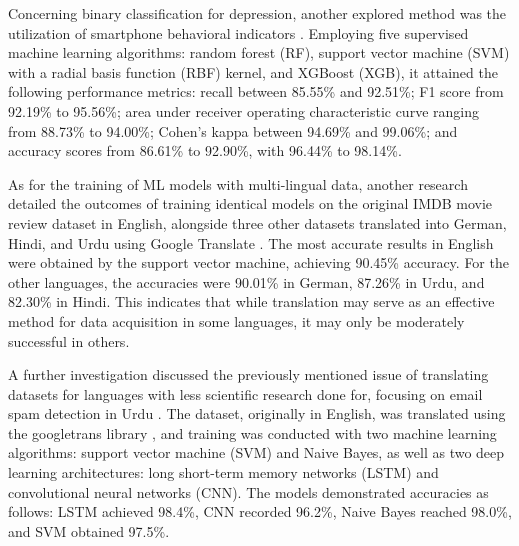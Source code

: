 Concerning binary classification for depression, another explored method was the utilization of smartphone behavioral indicators \cite{opoku2021predicting}. Employing five supervised machine learning algorithms: random forest (RF), support vector machine (SVM) with a radial basis function (RBF) kernel, and XGBoost (XGB), it attained the following performance metrics: recall between 85.55\% and 92.51\%; F1 score from 92.19\% to 95.56\%; area under receiver operating characteristic curve ranging from 88.73\% to 94.00\%; Cohen's kappa between 94.69\% and 99.06\%; and accuracy scores from 86.61\% to 92.90\%, with 96.44\% to 98.14\%.

As for the training of ML models with multi-lingual data, another research detailed the outcomes of training identical models on the original IMDB movie review dataset in English, alongside three other datasets translated into German, Hindi, and Urdu using Google Translate \cite{ghafoor2021impact}. The most accurate results in English were obtained by the support vector machine, achieving 90.45\% accuracy. For the other languages, the accuracies were 90.01\% in German, 87.26\% in Urdu, and 82.30\% in Hindi. This indicates that while translation may serve as an effective method for data acquisition in some languages, it may only be moderately successful in others.


A further investigation discussed the previously mentioned issue of translating datasets for languages with less scientific research done for, focusing on email spam detection in Urdu \cite{siddique2021machine}. The dataset, originally in English, was translated using the googletrans library \cite{googletranslib}, and training was conducted with two machine learning algorithms: support vector machine (SVM) and Naive Bayes, as well as two deep learning architectures: long short-term memory networks (LSTM) and convolutional neural networks (CNN). The models demonstrated accuracies as follows: LSTM achieved 98.4\%, CNN recorded 96.2\%, Naive Bayes reached 98.0\%, and SVM obtained 97.5\%.
